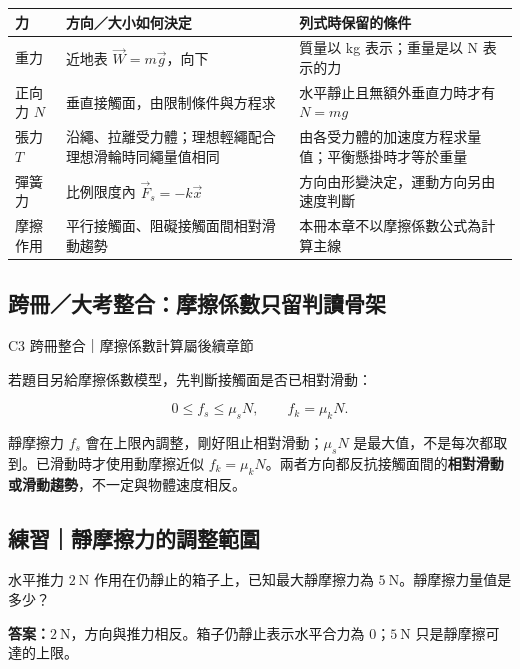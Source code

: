 \documentclass[11pt,a4paper]{article}
\newcounter{none}
\begin{document}
{\def\LTcaptype{none} %
\begin{longtable}[]{@{}
  >{\raggedright\arraybackslash}p{}
  >{\raggedright\arraybackslash}p{}
  >{\raggedright\arraybackslash}p{}@{}}
\toprule\noalign{}
\begin{minipage}[b]{\linewidth}\raggedright
力
\end{minipage} & \begin{minipage}[b]{\linewidth}\raggedright
方向／大小如何決定
\end{minipage} & \begin{minipage}[b]{\linewidth}\raggedright
列式時保留的條件
\end{minipage} \\
\midrule\noalign{}
\endhead
\bottomrule\noalign{}
\endlastfoot
重力 & 近地表 \(\vec W=m\vec g\)，向下 & 質量以 kg 表示；重量是以 N 表示的力 \\
正向力 \(N\) & 垂直接觸面，由限制條件與方程求 & 水平靜止且無額外垂直力時才有 \(N=mg\) \\
張力 \(T\) & 沿繩、拉離受力體；理想輕繩配合理想滑輪時同繩量值相同 & 由各受力體的加速度方程求量值；平衡懸掛時才等於重量 \\
彈簧力 & 比例限度內 \(\vec F_s=-k\vec x\) & 方向由形變決定，運動方向另由速度判斷 \\
摩擦作用 & 平行接觸面、阻礙接觸面間相對滑動趨勢 & 本冊本章不以摩擦係數公式為計算主線 \\
\end{longtable}
}

\subsection{跨冊／大考整合：摩擦係數只留判讀骨架}\label{ux8de8ux518aux5927ux8003ux6574ux5408ux6469ux64e6ux4fc2ux6578ux53eaux7559ux5224ux8b80ux9aa8ux67b6}

{C3 跨冊整合｜摩擦係數計算屬後續章節}

若題目另給摩擦係數模型，先判斷接觸面是否已相對滑動：

\[
0\le f_s\le \mu_sN,
\qquad
f_k=\mu_kN.
\]

靜摩擦力 \(f_s\) 會在上限內調整，剛好阻止相對滑動；\(\mu_sN\) 是最大值，不是每次都取到。已滑動時才使用動摩擦近似 \(f_k=\mu_kN\)。兩者方向都反抗接觸面間的\textbf{相對滑動或滑動趨勢}，不一定與物體速度相反。

\begin{HandoutSelfCheck}

\subsection{練習｜靜摩擦力的調整範圍}\label{ux7df4ux7fd2ux975cux6469ux64e6ux529bux7684ux8abfux6574ux7bc4ux570d}

水平推力 \(2\ \mathrm N\) 作用在仍靜止的箱子上，已知最大靜摩擦力為 \(5\ \mathrm N\)。靜摩擦力量值是多少？

\textbf{答案：}\(2\ \mathrm N\)，方向與推力相反。箱子仍靜止表示水平合力為 0；\(5\ \mathrm N\) 只是靜摩擦可達的上限。

\end{HandoutSelfCheck}
\end{document}
